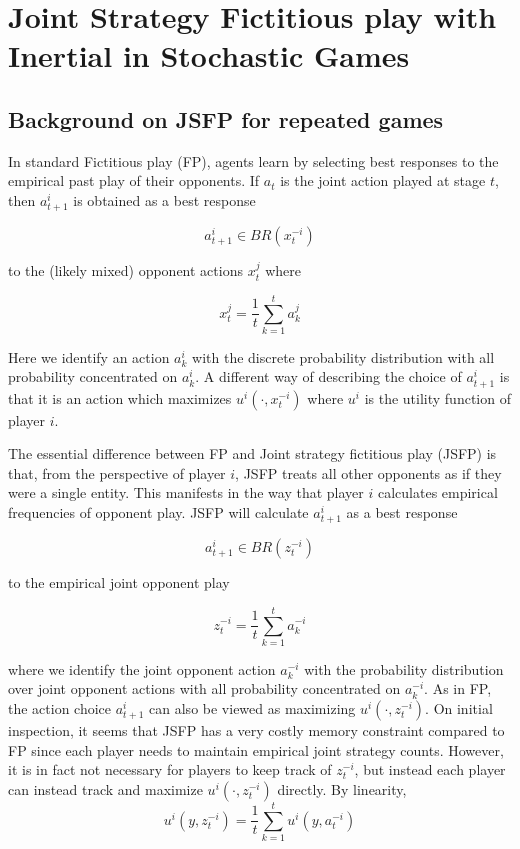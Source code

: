 
\section{Joint Strategy Fictitious play with Inertial in Stochastic Games}


\subsection{Background on JSFP for repeated games}


In standard Fictitious play (FP), agents learn by selecting best responses to the empirical past play of their opponents. If $a_t$ is the joint action played at stage $t$, then $a_{t+1}^i$ is obtained as a best response

$$
a_{t+1}^i \in BR(x_t^{-i})
$$


to the (likely mixed) opponent actions $x_t^j$ where 

$$
x_t^j = \frac{1}{t} \sum_{k=1}^t a_k^j
$$

Here we identify an action $a_k^i$ with the discrete probability distribution with all probability concentrated on $a_k^i$. A different way of describing the choice of $a_{t+1}^i$ is that it is an action which maximizes $u^i(\cdot, x_t^{-i})$ where $u^i$ is the utility function of player $i$.



The essential difference between FP and Joint strategy fictitious play (JSFP) is that, from the perspective of player $i$, JSFP treats all other opponents as if they were a single entity. This manifests in the way that player $i$ calculates empirical frequencies of opponent play. JSFP will calculate $a_{t+1}^i$ as a best response

$$
a_{t+1}^i \in BR(z_t^{-i})
$$

to the empirical joint opponent play

$$
z_t^{-i} = \frac{1}{t} \sum_{k=1}^t a_{k}^{-i}
$$

where we identify the joint opponent action $a_{k}^{-i}$ with the probability distribution over joint opponent actions with all probability concentrated on $a_{k}^{-i}$. As in FP, the action choice $a_{t+1}^i$ can also be viewed as maximizing $u^i(\cdot, z_t^{-i})$. On initial inspection, it seems that JSFP has a very costly memory constraint compared to FP since each player needs to maintain empirical joint strategy counts. However, it is in fact not necessary for players to keep track of $z_t^{-i}$, but instead each player can instead track and maximize $u^i(\cdot, z_t^{-i})$ directly. By linearity,
$$
u^i(y, z^{-i}_t) = \frac{1}{t} \sum_{k=1}^t u^i(y, a^{-i}_t)
$$ 

